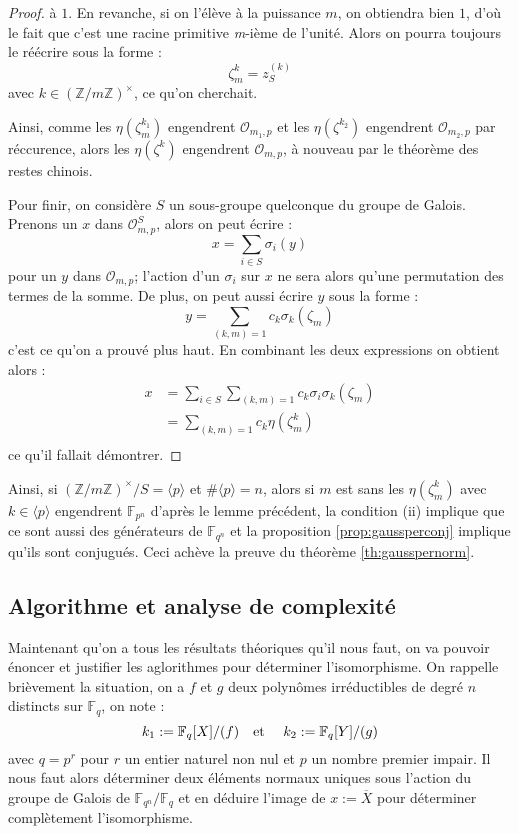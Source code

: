 \documentclass[a4paper]{article} %
\numberwithin{section}{part}
\numberwithin{equation}{section}
\newcommand\nroot[1]{\textit{#1}-ième}
\newcommand\zmodninv[1]{(\mathbb{Z}/#1\mathbb{Z})^{\times}}
\newcommand\GF[1]{\mathbb{F}_{#1}}
\newcommand\EO{\mathcal{O}}
\newcommand\etmath{\textup{\quad et \quad}}
\newcommand\groupgen[1]{\langle{#1}\rangle}
\begin{document}
\begin{proof}
à $1$. En revanche, si on l'élève à la puissance $m$, on obtiendra bien $1$, 
d'où le fait que c'est une racine primitive \nroot{m} de l'unité. Alors on 
pourra toujours le réécrire sous la forme : 
\[\zeta_m^k = z_S^{(k)}\]
avec $k\in\zmodninv{m}$, ce qu'on cherchait.\par
\fi
Ainsi, comme les $\eta(\zeta_m^{k_1})$ engendrent $\EO_{m_1,p}$ et les 
$\eta(\zeta^{k_2})$ engendrent $\EO_{m_2,p}$ par réccurence, alors les 
$\eta(\zeta^k)$ engendrent $\EO_{m,p}$, à nouveau par le théorème des restes 
chinois.\par
Pour finir, on considère $S$ un sous-groupe quelconque du groupe de Galois. 
Prenons un $x$ dans $\EO_{m,p}^S$, alors on peut écrire :
\begin{equation}
x = \sum_{i\in S}{\sigma_i(y)}
\end{equation}
pour un $y$ dans $\EO_{m,p}$; l'action d'un $\sigma_i$ sur $x$ ne sera alors
qu'une permutation des termes de la somme. De plus, on peut aussi écrire $y$ 
sous la forme :
\begin{equation}
y = \sum_{(k,m)=1}{c_k\sigma_k(\zeta_m)}
\end{equation}
c'est ce qu'on a prouvé plus haut. En combinant les deux expressions on obtient 
alors :
\begin{align*}
x &= \sum_{i\in S}{\sum_{(k,m)=1}{c_k\sigma_i\sigma_k(\zeta_m)}}\\
&= \sum_{(k,m)=1}{c_k\eta(\zeta_m^k)}\\
\end{align*}
ce qu'il fallait démontrer.
\end{proof}

Ainsi, si $\zmodninv{m}/S = \groupgen{p}$ et $\#\groupgen{p} = n$, alors si $m$ 
est sans les $\eta(\zeta_m^k)$ avec $k\in\groupgen{p}$  engendrent $\GF{p^n}$
d'après le lemme précédent, la condition (ii) implique que ce sont aussi
des générateurs de $\GF{q^n}$ et la proposition \ref{prop:gaussperconj} implique
qu'ils sont conjugués. Ceci achève la preuve du théorème \ref{th:gausspernorm}.

\subsection{Algorithme et analyse de complexité}
\label{sec:algcompcycl}
Maintenant qu'on a tous les résultats théoriques qu'il nous faut, on va pouvoir
énoncer et justifier les aglorithmes pour déterminer l'isomorphisme. 
On rappelle brièvement la situation, on a $f$ et $g$ deux polynômes 
irréductibles de degré $n$ distincts sur $\GF{q}$, on note :
\[k_1 := \GF{q}[X]/(f)\etmath k_2 := \GF{q}[Y]/(g)\]
avec $q = p^r$ pour $r$ un entier naturel non nul et $p$ un nombre premier
impair. Il nous faut alors déterminer deux éléments normaux uniques sous
l'action du groupe de Galois de $\GF{q^n}/\GF{q}$ et en déduire l'image de $x :=
\overline{X}$ pour déterminer complètement l'isomorphisme. 
\end{document}
